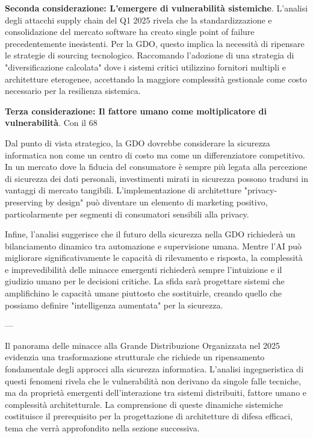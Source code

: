 {\textbf{Seconda considerazione: L'emergere di vulnerabilità sistemiche}. L'analisi degli attacchi supply chain del Q1 2025 rivela che la standardizzazione e consolidazione del mercato software ha creato single point of failure precedentemente inesistenti. Per la GDO, questo implica la necessità di ripensare le strategie di sourcing tecnologico. Raccomando l'adozione di una strategia di "diversificazione calcolata" dove i sistemi critici utilizzino fornitori multipli e architetture eterogenee, accettando la maggiore complessità gestionale come costo necessario per la resilienza sistemica.

\textbf{Terza considerazione: Il fattore umano come moltiplicatore di vulnerabilità}. Con il 68%

Dal punto di vista strategico, la GDO dovrebbe considerare la sicurezza informatica non come un centro di costo ma come un differenziatore competitivo. In un mercato dove la fiducia del consumatore è sempre più legata alla percezione di sicurezza dei dati personali, investimenti mirati in sicurezza possono tradursi in vantaggi di mercato tangibili. L'implementazione di architetture "privacy-preserving by design" può diventare un elemento di marketing positivo, particolarmente per segmenti di consumatori sensibili alla privacy.

Infine, l'analisi suggerisce che il futuro della sicurezza nella GDO richiederà un bilanciamento dinamico tra automazione e supervisione umana. Mentre l'AI può migliorare significativamente le capacità di rilevamento e risposta, la complessità e imprevedibilità delle minacce emergenti richiederà sempre l'intuizione e il giudizio umano per le decisioni critiche. La sfida sarà progettare sistemi che amplifichino le capacità umane piuttosto che sostituirle, creando quello che possiamo definire "intelligenza aumentata" per la sicurezza.

---

Il panorama delle minacce alla Grande Distribuzione Organizzata nel 2025 evidenzia una trasformazione strutturale che richiede un ripensamento fondamentale degli approcci alla sicurezza informatica. L'analisi ingegneristica di questi fenomeni rivela che le vulnerabilità non derivano da singole falle tecniche, ma da proprietà emergenti dell'interazione tra sistemi distribuiti, fattore umano e complessità architetturale. La comprensione di queste dinamiche sistemiche costituisce il prerequisito per la progettazione di architetture di difesa efficaci, tema che verrà approfondito nella sezione successiva.

}
